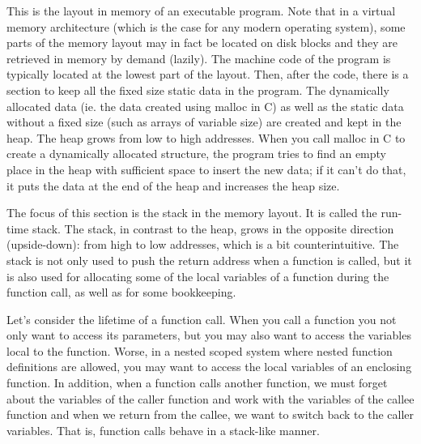 \documentclass[a4paper, twoside]{article}
\begin{document}
This is the layout in memory of an executable program. Note that in a virtual memory architecture (which is the case for any modern operating system), some parts of the memory layout may in fact be located on disk blocks and they are retrieved in memory by demand (lazily). 
The machine code of the program is typically located at the lowest part of the layout. Then, after the code, there is a section to keep all the fixed size static data in the program. The dynamically allocated data (ie. the data created using malloc in C) as well as the static data without a fixed size (such as arrays of variable size) are created and kept in the heap. The heap grows from low to high addresses. When you call malloc in C to create a dynamically allocated structure, the program tries to find an empty place in the heap with sufficient space to insert the new data; if it can't do that, it puts the data at the end of the heap and increases the heap size.

The focus of this section is the stack in the memory layout. It is called the run-time stack. The stack, in contrast to the heap, grows in the opposite direction (upside-down): from high to low addresses, which is a bit counterintuitive. The stack is not only used to push the return address when a function is called, but it is also used for allocating some of the local variables of a function during the function call, as well as for some bookkeeping.

Let’s consider the lifetime of a function call. When you call a function you not only want to access its parameters, but you may also want to access the variables local to the function. Worse, in a nested scoped system where nested function definitions are allowed, you may want to access the local variables of an enclosing function. In addition, when a function calls another function, we must forget about the variables of the caller function and work with the variables of the callee function and when we return from the callee, we want to switch back to the caller variables. That is, function calls behave in a stack-like manner.
\end{document}
